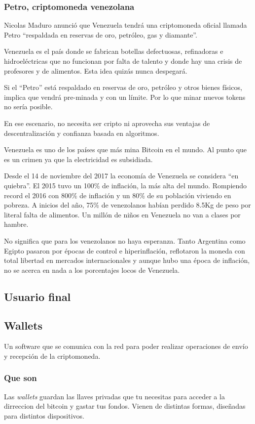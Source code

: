 \documentclass[12pt,letterpaper]{article}
\begin{document}
\subsubsection*{Petro, criptomoneda venezolana}
Nicolas Maduro anunció que Venezuela tendrá una criptomoneda oficial llamada Petro “respaldada en reservas de oro, petróleo, gas y diamante”.

Venezuela es el país donde se fabrican botellas defectuosas, refinadoras e hidroeléctricas que no funcionan por falta de talento y donde hay una crisis de profesores y de alimentos. Esta idea quizás nunca despegará.

Si el “Petro” está respaldado en reservas de oro, petróleo y otros bienes físicos, implica que vendrá pre-minada y con un límite. Por lo que minar nuevos tokens no sería posible.

En ese escenario, no necesita ser cripto ni aprovecha sus ventajas de descentralización y confianza basada en algoritmos. 

Venezuela es uno de los países que más mina Bitcoin en el mundo. Al punto que es un crimen ya que la electricidad es subsidiada.

Desde el 14 de noviembre del 2017 la economía de Venezuela se considera “en quiebra”. El 2015 tuvo un 100\% de inflación, la más alta del mundo. Rompiendo record el 2016 con 800\% de inflación y un 80\% de su población viviendo en pobreza. A inicios del año, 75\% de venezolanos habían perdido 8.5Kg de peso por literal falta de alimentos. Un millón de niños en Venezuela no van a clases por hambre.

No significa que para los venezolanos no haya esperanza. Tanto Argentina como Egipto pasaron por épocas de control e hiperinflación, reflotaron la moneda con total libertad en mercados internacionales y aunque hubo una época de inflación, no se acerca en nada a los porcentajes locos de Venezuela.
        \subsection*{Usuario final}

            \subsection*{Wallets}
Un software que se comunica con la red para poder realizar operaciones de env\'io y recepci\'on de la criptomoneda.
                \subsubsection*{Que son}
                Las \textit{wallets} guardan las llaves privadas que tu necesitas para acceder a la dirreccion del bitcoin y gastar tus fondos. Vienen de distintas formas, dise\~nadas para distintos dispositivos.
                
\end{document}
